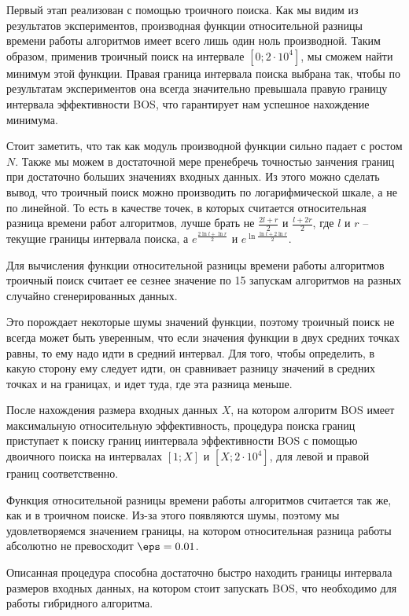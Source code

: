 Первый этап реализован с помощью троичного поиска. Как мы видим из результатов экспериментов, производная функции относительной разницы времени работы алгоритмов имеет всего лишь один ноль производной. Таким образом, применив троичный поиск на интервале $[0; 2 \cdot 10^4]$, мы сможем найти минимум этой функции. Правая граница интервала поиска выбрана так, чтобы по результатам экспериментов она всегда значительно превышала правую границу интервала эффективности BOS, что гарантирует нам успешное нахождение минимума.

Стоит заметить, что так как модуль производной функции сильно падает с ростом $N$. Также мы можем в достаточной мере пренебречь точностью занчения границ при достаточно больших значениях входных данных. Из этого можно сделать вывод, что троичный поиск можно производить по логарифмической шкале, а не по линейной. То есть в качестве точек, в которых считается относительная разница времени работ алгоритмов, лучше брать не $\frac{2l + r}{2}$ и $\frac{l + 2r}{2}$, где $l$ и $r$ -- текущие границы интервала поиска, а $e^{\frac{2\ln l + \ln r}{2}}$ и $e^{\ln\frac{\ln l + 2 \ln r}{2}}$.

Для вычисления функции относительной разницы времени работы алгоритмов троичный поиск считает ее сезнее значение по 15 запускам алгоритмов на разных случайно сгенерированных данных.

Это порождает некоторые шумы значений функции, поэтому троичный поиск не всегда может быть уверенным, что если значения функции в двух средних точках равны, то ему надо идти в средний интервал. Для того, чтобы определить, в какую сторону ему следует идти, он сравнивает разницу значений в средних точках и на границах, и идет туда, где эта разница меньше.

После нахождения размера входных данных $X$, на котором алгоритм BOS имеет максимальную относительную эффективность, процедура поиска границ приступает к поиску границ иинтервала эффективности BOS с помощью двоичного поиска на интервалах $[1;X]$ и $[X;2\cdot10^4]$, для левой и правой границ соответственно.

Функция относительной разницы времени работы алгоритмов считается так же, как и в троичном поиске. Из-за этого появляются шумы, поэтому мы удовлетворяемся значением границы, на котором относительная разница работы абсолютно не превосходит $\eps = 0.01$.

Описанная процедура способна достаточно быстро находить границы интервала размеров входных данных, на котором стоит запускать BOS, что необходимо для работы гибридного алгоритма.

